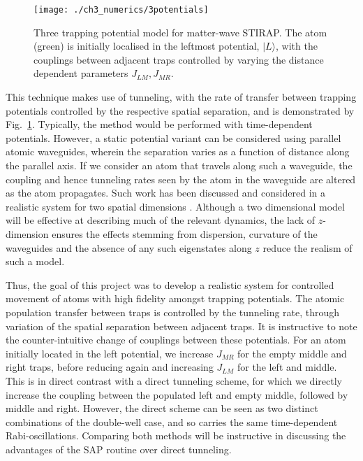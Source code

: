 \begin{figure}
    \centering
    \texttt{[image: ./ch3\_numerics/3potentials]}
    \caption{Three trapping potential model for matter-wave STIRAP. The atom (green) is initially localised in the leftmost potential, $|L\rangle$, with the couplings between adjacent traps controlled by varying the distance dependent parameters $J_{LM},J_{MR}$.}
    \label{fig:ch3_stirap}
\end{figure}

This technique makes use of tunneling, with the rate of transfer between trapping potentials controlled by the respective spatial separation, and is demonstrated by Fig.~\ref{fig:ch3_stirap}. Typically, the method would be performed with time-dependent potentials. However, a static potential variant can be considered using parallel atomic waveguides, wherein the separation varies as a function of distance along the parallel axis. If we consider an atom that travels along such a waveguide, the coupling and hence tunneling rates seen by the atom in the waveguide are altered as the atom propagates. Such work has been discussed and considered in a realistic system for two spatial dimensions \cite{OSullivan:10}. Although a two dimensional model will be effective at describing much of the relevant dynamics, the lack of $z$-dimension ensures the effects stemming from dispersion, curvature of the waveguides and the absence of any such eigenstates along $z$ reduce the realism of such a model.



Thus, the goal of this project was to develop a realistic system for controlled movement of atoms with high fidelity amongst trapping potentials. The atomic population transfer between traps is controlled by the tunneling rate, through variation of the spatial separation between adjacent traps. It is instructive to note the counter-intuitive change of couplings between these potentials. For an atom initially located in the left potential, we increase $J_{MR}$ for the empty middle and right traps, before reducing again and increasing $J_{LM}$ for the left and middle. This is in direct contrast with a direct tunneling scheme, for which we directly increase the coupling between the populated left and empty middle, followed by middle and right. However, the direct scheme can be seen as two distinct combinations of the double-well case, and so carries the same time-dependent Rabi-oscillations. Comparing both methods will be instructive in discussing the advantages of the SAP routine over direct tunneling. %


